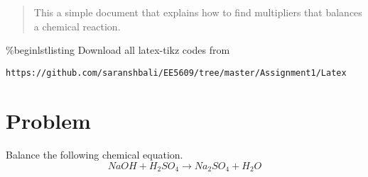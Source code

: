 \documentclass[journal,12pt,twocolumn]{IEEEtran}
\begin{document}
%
\begin{abstract}
This a simple document that explains how to find multipliers that balances a chemical reaction.
\end{abstract}
%
\%begin{lstlisting}
%
Download all latex-tikz codes from 
%
\begin{lstlisting}
https://github.com/saranshbali/EE5609/tree/master/Assignment1/Latex
\end{lstlisting}
%
\section{Problem}
Balance the following chemical equation.
\begin{equation*}
NaOH + H_2SO_4 \xrightarrow{} Na_2SO_4  +  H_2O
\end{equation*}
\end{document}
